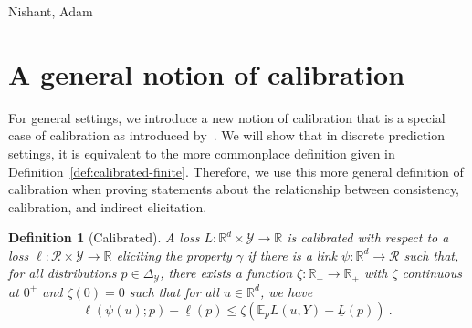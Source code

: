 \documentclass{article}
\newcommand{\reals}{\mathbb{R}}
\newcommand{\simplex}{\Delta_\Y}
\newcommand{\E}{\mathbb{E}}
\newcommand{\R}{\mathcal{R}}
\newcommand{\Y}{\mathcal{Y}}
\newcommand{\exploss}[3]{\E_{#3} #1(#2,Y)}
\newcommand{\risk}[1]{\underline{#1}}
\newtheorem{definition}{Definition}
\begin{document}

\begin{ack}
Nishant, Adam
\end{ack}




\newpage
\appendix
\section{A general notion of calibration}\label{app:calibration}
For general settings, we introduce a new notion of calibration that is a special case of calibration as introduced by~\citet[Chapter 3]{steinwart2008support}.
We will show that in discrete prediction settings, it is equivalent to the more commonplace definition given in Definition~\ref{def:calibrated-finite}.
Therefore, we use this more general definition of calibration when proving statements about the relationship between consistency, calibration, and indirect elicitation.

\begin{definition}[Calibrated]\label{def:calibrated-general}
	A loss $L:\reals^d \times \Y \to \reals$ is \emph{calibrated} with respect to a loss $\ell : \R \times \Y \to \reals$ eliciting the property $\gamma$ if there is a link $\psi : \reals^d \to \R$ such that, for all distributions $p \in \simplex$, there exists a function $\zeta : \reals_+ \to \reals_+$ with $\zeta$ continuous at $0^+$ and $\zeta(0) = 0$ such that for all $u \in \reals^d$, we have
	\begin{equation}\label{eq:calibrated-general}
	\ell( \psi(u); p) - \risk{\ell}(p)  \leq \zeta \left(  \exploss{L}{u}{p} - \risk{L}(p) \right)~.~
	\end{equation}
\end{definition}
\end{document}
